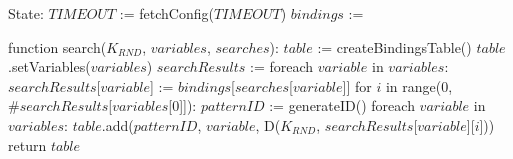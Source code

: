 State:
    $TIMEOUT$ := fetchConfig($TIMEOUT$)
    $bindings$ := {}

function search($K_{RND}$, $variables$, $searches$):
    $table$ := createBindingsTable()
    $table$.setVariables($variables$)
    $searchResults$ := {}
    foreach $variable$ in $variables$:
        $searchResults$[$variable$] := $bindings$[$searches$[$variable$]]
    for $i$ in range(0, $\#searchResults$[$variables$[0]]):
        $patternID$ := generateID()
        foreach $variable$ in $variables$:
            $table$.add($patternID$, $variable$, D($K_{RND}$, $searchResults$[$variable$][$i$]))
    return $table$